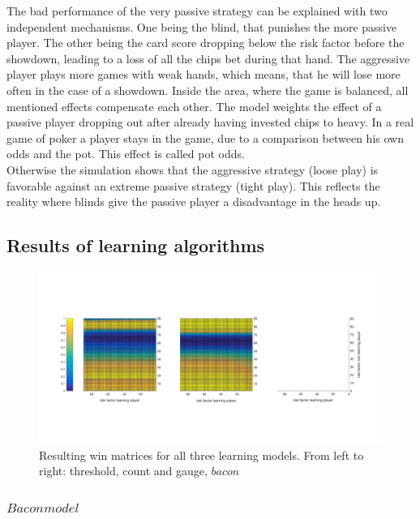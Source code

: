 \documentclass[11pt]{article}
\begin{document}
The bad performance of the very passive strategy can be explained with two independent mechanisms. One being the blind, that punishes the more passive player. The other being the card score dropping below the risk factor before the showdown, leading to a loss of all the chips bet during that hand.
The aggressive player plays more games with weak hands, which means, that he will lose more often in the case of a showdown. 
Inside the area, where the game is balanced, all mentioned effects compensate each other.
The model weights the effect of a passive player dropping out after already having invested chips to heavy. In a real game of poker a player stays in the game, due to a comparison between his own odds and the pot. This effect is called pot odds.\\
Otherwise the simulation shows that the aggressive strategy (loose play) is favorable against an extreme passive strategy (tight play). This reflects the reality where blinds give the passive player a disadvantage in the heads up.\\

\subsection{Results of learning algorithms}

\begin{figure}
\begin{center}
\includegraphics[scale=.2]{Graphics/LearningAllThreeWins}
\end{center}
\caption{Resulting win matrices for all three learning models. From left to right: threshold, count and gauge, $bacon$}
\label{LearningModelsAllDataOverview}
\end{figure}

\subsubsection{$Bacon model$}
\end{document}
